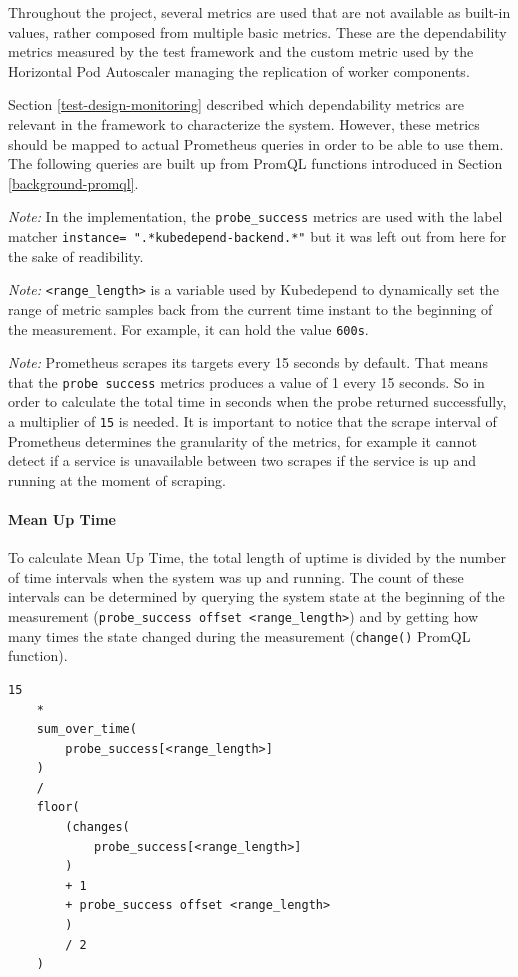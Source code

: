 Throughout the project, several metrics are used that are not available as built-in values, rather composed from multiple basic metrics. These are the dependability metrics measured by the test framework and the custom metric used by the Horizontal Pod Autoscaler managing the replication of worker components.

 Section \ref{test-design-monitoring} described which dependability metrics are relevant in the framework to characterize the system. However, these metrics should be mapped to actual Prometheus queries in order to be able to use them. The following queries are built up from PromQL functions introduced in Section \ref{background-promql}.
 

\emph{Note:} In the implementation, the \texttt{probe\_success} metrics are used with the label matcher \texttt{instance=~".*kubedepend-backend.*"} but it was left out from here for the sake of readibility.

\emph{Note:} \texttt{<range\_length>} is a variable used by Kubedepend to dynamically set the range of metric samples back from the current time instant to the beginning of the measurement. For example, it can hold the value \texttt{600s}.

\emph{Note:} Prometheus scrapes its targets every 15 seconds by default. That means that the \texttt{probe\ success} metrics produces a value of 1 every 15 seconds. So in order to calculate the total time in seconds when the probe returned successfully, a multiplier of \texttt{15} is needed. It is important to notice that the scrape interval of Prometheus determines the granularity of the metrics, for example it cannot detect if a service is unavailable between two scrapes if the service is up and running at the moment of scraping.
 
 \paragraph{Mean Up Time} To calculate Mean Up Time, the total length of uptime is divided by the number of time intervals when the system was up and running. The count of these intervals can be determined by querying the system state at the beginning of the measurement (\texttt{probe\_success\ offset\ <range\_length>}) and by getting how many times the state changed during the measurement (\texttt{change()} PromQL function).
 
 \vspace{0.5cm}
 \begin{minipage}{\linewidth}
 	\begin{lstlisting}[caption={Mean Up Time defined in PromQL}, label={lst:promql-mut}]
 	15
 	* 
 	sum_over_time(
 		probe_success[<range_length>]
 	)
 	/ 
 	floor(
 		(changes(
 			probe_success[<range_length>]
 		)
 		+ 1
 		+ probe_success offset <range_length>
 		)
 		/ 2
 	)\end{lstlisting}
 \end{minipage}
 

